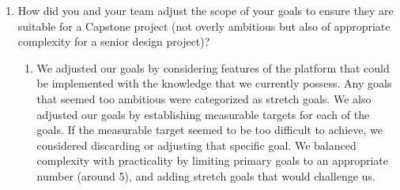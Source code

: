 \documentclass{article}
\begin{document}
\begin{enumerate}
\begin{enumerate}
    \end{enumerate}
    \item How did you and your team adjust the scope of your goals to ensure
    they are suitable for a Capstone project (not overly ambitious but also of
    appropriate complexity for a senior design project)?
    \begin{enumerate}
        \item We adjusted our goals by considering features of the platform that could be implemented with the knowledge that we currently possess. Any goals that seemed too ambitious were categorized as stretch goals. We also adjusted our goals by establishing measurable targets for each of the goals. If the measurable target seemed to be too difficult to achieve, we considered discarding or adjusting that specific goal. We balanced complexity with practicality by limiting primary goals to an appropriate number (around 5), and adding stretch goals that would challenge us.
    \end{enumerate}
\end{enumerate}  
\end{document}
